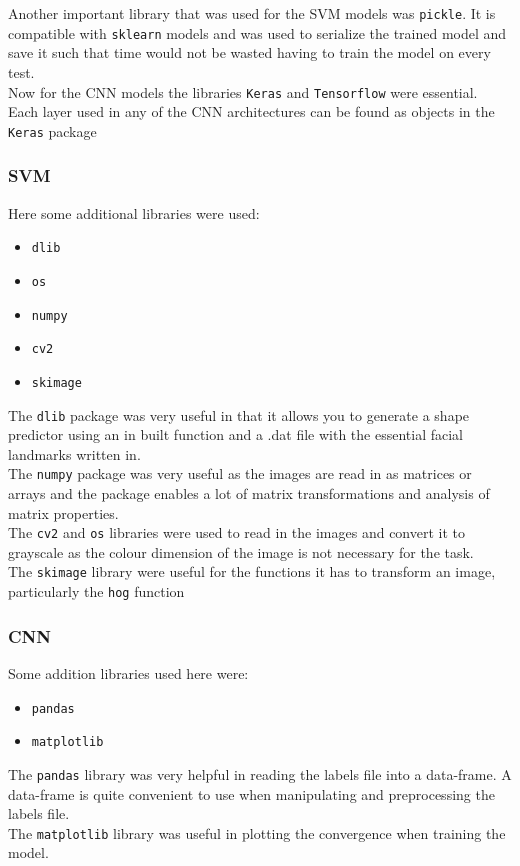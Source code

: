 \documentclass{article}
\begin{document}
    Another important library that was used for the SVM models was \verb|pickle|. It is compatible with \verb|sklearn| models and was used to serialize the trained model and save it such that time would not be wasted having to train the model on every test.\\
    
    Now for the CNN models the libraries \verb|Keras| and \verb|Tensorflow| were essential. Each layer used in any of the CNN architectures can be found as objects in the \verb|Keras| package
    \subsubsection{SVM}
	Here some additional libraries were used:
	\begin{itemize}
		\item \verb|dlib|
		\item \verb|os|
		\item \verb|numpy|
		\item \verb|cv2|
		\item \verb|skimage|
	\end{itemize}
	The \verb|dlib| package was very useful in that it allows you to generate a shape predictor using an in built function and a .dat file with the essential facial landmarks written in.\\
	The \verb|numpy| package was very useful as the images are read in as matrices or arrays and the package enables a lot of matrix transformations and analysis of matrix properties.\\
	The \verb|cv2| and \verb|os| libraries were used to read in the images and convert it to grayscale as the colour dimension of the image is not necessary for the task.\\
	The \verb|skimage| library were useful for the functions it has to transform an image, particularly the \verb|hog| function
    \subsubsection{CNN}
    Some addition libraries used here were:
    \begin{itemize}
    	\item \verb|pandas|
    	\item \verb|matplotlib|
    \end{itemize}
    The \verb|pandas| library was very helpful in reading the labels file into a data-frame. A data-frame is quite convenient to use when manipulating and preprocessing the labels file.\\
    The \verb|matplotlib| library was useful in plotting the convergence when training the model. 
\end{document}
